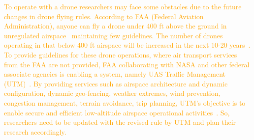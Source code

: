 \textcolor{orange}{To operate with a drone researchers may face some obstacles due to the future changes in drone flying rules. According to FAA (Federal Aviation Administration), anyone can fly a drone under 400 ft above the ground in unregulated airspace~\cite{FAAdrone} maintaining few guidelines. The number of drones operating in that below 400 ft airspace will be increased in the next 10-20 years~\cite{NASAdrone}. To provide guidelines for these drone operations, where air transport services from the FAA are not provided, FAA collaborating with NASA and other federal associate agencies is enabling a system, namely UAS Traffic Management (UTM)~\cite{kopardekar2014unmanned}. By providing services such as airspace architecture and dynamic configuration, dynamic geo-fencing, weather extremes, wind prevention, congestion management, terrain avoidance, trip planning, UTM's objective is to enable secure and efficient low-altitude airspace operational activities~\cite{dronetraffic}. So, researchers need to be updated with the revised rule by UTM and plan their research accordingly.}
